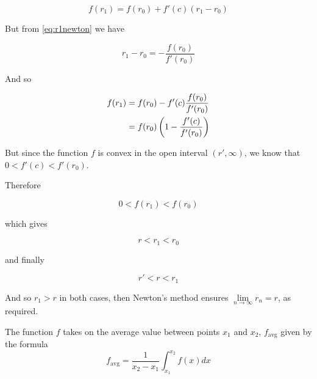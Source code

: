 \begin{lemma}
\begin{pf}
\begin{itemize}
$$f(r_1)= f(r_0) + f'(c)(r_1-r_0)$$

But from \eqref{eq:r1newton} we have 

$$r_1-r_0 = - \frac{f(r_0)}{f'(r_0)}$$

And so 

\begin{align}
f(r_1) 
&= f(r_0) - f'(c)\frac{f(r_0)}{f'(r_0)} \\
&= f(r_0)\left(1-\frac{f'(c)}{f'(r_0)}\right)
\end{align}

But since the function $f$ is convex in the open interval $(r',\infty)$, we know that $0 < f'(c) <f'(r_0)$.

Therefore 

$$0<f(r_1) < f(r_0)$$

which gives

$$r < r_1 < r_0$$

and finally

\begin{equation}\label{r1ineq}
r' < r < r_1
\end{equation}
\end{itemize}
And so $r_1>r$ in both cases, then Newton's method ensures $\lim\limits_{n\to\infty} r_n = r$, as required.
\end{pf}
\end{lemma}


\begin{definition}
The function $f$ takes on the average value between points $x_1$ and $x_2$, $f_{\text{avg}}$  given by the formula 
\begin{equation} \label{eq:avgvalue}
    f_{\text{avg}} = \frac1{x_2-x_1} \int_{x_1}^{x_2} f(x)dx
\end{equation}
\end{definition}

